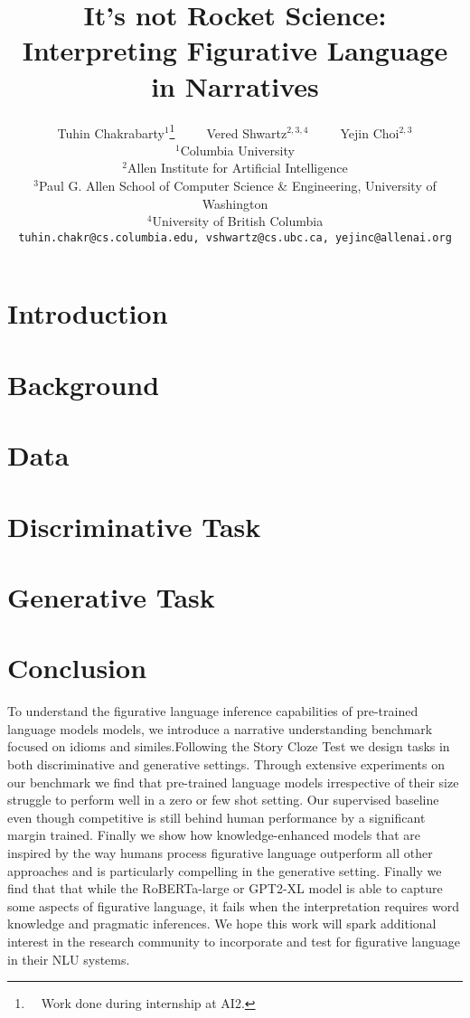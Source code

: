 \documentclass[11pt]{article}
\title{It's not Rocket Science:\\Interpreting Figurative Language in Narratives}
\author{Tuhin Chakrabarty$^1$\thanks{~~Work done during internship at AI2.}~~~~~Vered Shwartz$^{2,3,4}$~~~~~Yejin Choi$^{2,3}$ \\
 $^1$Columbia University\\
 $^2$Allen Institute for Artificial Intelligence\\
 $^3$Paul G. Allen School of Computer Science \& Engineering, University of Washington\\  
 $^4$University of British Columbia\\
 {\tt\small tuhin.chakr@cs.columbia.edu, vshwartz@cs.ubc.ca, yejinc@allenai.org} \\
}
\begin{document}
\maketitle
\begin{abstract}

\end{abstract}

\section{Introduction}
\label{sec:intro}


\section{Background}
\label{sec:bg}


\section{Data}
\label{sec:data}


\section{Discriminative Task}
\label{sec:disc}


\section{Generative Task}
\label{sec:generative}


\section{Conclusion}
\label{sec:conclusion}
To understand the figurative language inference capabilities of pre-trained language models  models, we introduce a narrative understanding benchmark focused on idioms and similes.Following the Story Cloze Test we design tasks in both discriminative and generative settings. Through extensive experiments on our benchmark we find that pre-trained language models irrespective of their size struggle to perform well in a zero or few shot setting. Our supervised baseline even though competitive is still behind human performance by a significant margin trained. Finally we show how knowledge-enhanced models that are inspired by the way humans process figurative language outperform all other approaches and is particularly compelling in the generative setting. Finally we find that that while the RoBERTa-large or GPT2-XL model is able to capture some aspects of figurative language, it fails when the interpretation requires word knowledge and pragmatic inferences. We hope this work will spark additional interest in the research community to incorporate and test for figurative language in their NLU systems.

\end{document}

